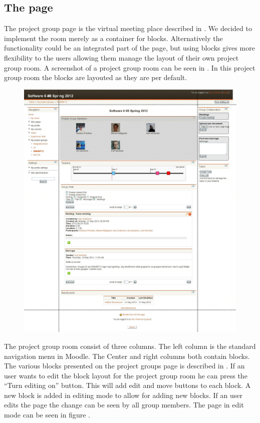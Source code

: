 \subsection{The page}
The project group page is the virtual meeting place described in .
We decided to implement the room merely as a container for blocks. 
Alternatively the functionality could be an integrated part of the page, but using blocks gives more flexibility to the users allowing them manage the layout of their own project group room. 
A screenshot of a project group room can be seen in . 
In this project group room the blocks are layouted as they are per default. 
\begin{figure}[h]
	\centering
		\includegraphics[width=\textwidth]{images/projectgroupnoedit.png}
	\label{fig:projectgroupnoedit}
\end{figure}

The project group room consist of three columns. 
The left column is the standard navigation menu in Moodle. 
The Center and right columns both contain blocks.
The various blocks presented on the project groups page is described in . 
If an user wants to edit the block layout for the project group room he can press the ``Turn editing on'' button. 
This will add edit and move buttons to each block. 
A new block is added in editing mode to allow for adding new blocks. 
If an user edits the page the change can be seen by all group members. 
The page in edit mode can be seen in figure .

